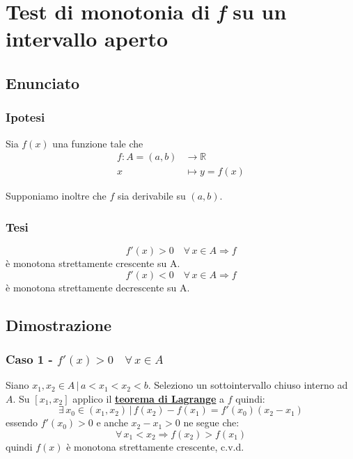 \documentclass[../dimostrazioni]{subfiles}
\begin{document}
    \chapter{Test di monotonia di \textit{f} su un intervallo aperto}

        \section*{Enunciato}

        \subsection*{Ipotesi}

            Sia \(f(x)\) una funzione tale che
            \begin{align*}
                f : A = (a, b) &\longrightarrow \mathbb{R}\\
                x &\longmapsto y = f(x) 
            \end{align*}

            Supponiamo inoltre che \(f\) sia derivabile su \((a, b)\).

        \subsection*{Tesi}

            \[ f'(x) > 0 \quad \forall \, x \in A \Rightarrow f \] è monotona strettamente crescente su A. 
            \[ f'(x) < 0 \quad \forall \, x \in A \Rightarrow f \] è monotona strettamente decrescente su A.

        \section*{Dimostrazione}

            \medskip

            \subsection*{Caso 1 - \( f'(x) > 0 \quad \forall \, x \in A \)}

            Siano \(x_1, x_2 \in A \, | \, a < x_1 < x_2 < b \). Seleziono un sottointervallo chiuso interno ad \(A\).
            Su \( [x_1, x_2] \) applico il \textbf{\hyperref[teoLagrange]{teorema di Lagrange}} a \(f\) quindi:
            \[
                \exists \, x_0 \in (x_1, x_2) \, | \, f(x_2) - f(x_1) = f'(x_0)(x_2 - x_1) 
            \]
            essendo \( f'(x_0) > 0 \) e anche \( x_2 - x_1 > 0 \) ne segue che:
            \[
                \forall \, x_1 < x_2 \Rightarrow f(x_2) > f(x_1)
            \]
            quindi \(f(x)\) è monotona strettamente crescente, c.v.d.
\end{document}
